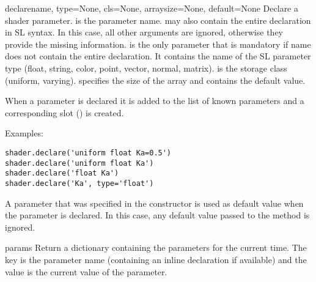 \begin{methoddesc}{declare}{name, type=None, cls=None, arraysize=None, default=None}
Declare a shader parameter.  is the parameter
name.  may also contain the entire declaration in SL
syntax. In this case, all other arguments are ignored, otherwise they
provide the missing information.  is the only parameter that is
mandatory if name does not contain the entire declaration. It contains
the name of the SL parameter type (float, string, color, point, vector,
normal, matrix).  is the storage class (uniform, varying).
 specifies the size of the array and  contains
the default value.

When a parameter is declared it is added to the list of known
parameters and a corresponding slot () is created.

Examples:

\begin{verbatim}
shader.declare('uniform float Ka=0.5')
shader.declare('uniform float Ka')
shader.declare('float Ka')
shader.declare('Ka', type='float')
\end{verbatim}

A parameter that was specified in the constructor is used as default value
when the parameter is declared. In this case, any default value passed to
the  method is ignored.
\end{methoddesc}

\begin{methoddesc}{params}{}
Return a dictionary containing the parameters for the current time.
The key is the parameter name (containing an inline declaration if
available) and the value is the current value of the parameter.
\end{methoddesc}
